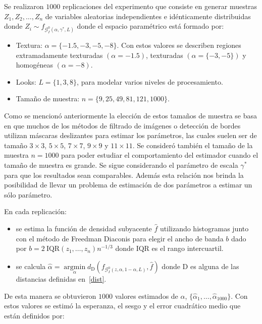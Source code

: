 Se realizaron $1000$ replicaciones del experimento que consiste en generar muestras $Z_1, Z_2,\ldots,Z_n$ de variables aleatorias independientes e idénticamente distribuidas donde $Z_i \sim f_{\mathcal{G}_I^0(\alpha,\gamma^*,L)}$ donde el espacio paramétrico está formado por:

\begin{itemize}
	\item Textura: $\alpha=\{-1.5, -3, -5, -8\}$. Con estos valores se describen regiones extramadamente texturadas $(\alpha=-1.5)$, texturadas $(\alpha=\{-3,-5\})$ y homogéneas $(\alpha=-8)$. 
	\item Looks: $L=\{1,3,8\}$, para modelar varios niveles de procesamiento.
	\item Tamaño de muestra: $n=\{9, 25,49, 81,121,1000\}$. 
\end{itemize}

Como se mencionó anteriormente la elección de estos tamaños de muestra se basa en que muchos de los métodos de filtrado de imágenes o detección de bordes utilizan máscaras deslizantes para estimar los parámetros, las cuales suelen ser de tamaño $3 \times 3$,  $5 \times 5$, $7 \times 7$, $9 \times 9$ y  $11 \times 11$. Se consideró también el tamaño de la muestra $n=1000$ para poder estudiar el comportamiento del estimador cuando el tamaño de muestra es grande. Se sigue considerando el parámetro de escala $\gamma^*$ para que los resultados sean comparables. Además esta relación nos brinda la posibilidad de llevar un problema de estimación de dos parámetros a estimar un sólo parámetro. 


En cada replicación:
\begin{itemize}
	\item se estima la función de densidad subyacente $\widehat{f}$ utilizando histogramas junto con el método de Freedman Diaconis para elegir el ancho de banda $b$ dado por $b=2 \ \text{IQR}(z_1,\ldots,z_n) n^{-1/3}$ donde $\text{IQR}$ es el rango intercuartil.
	\item se calcula $\widehat{\alpha}= \mathop{\text{argmin}}\limits_{\alpha}d_{\text{D}}(f_{\mathcal{G}_I^0(z,\alpha,1-\alpha,L)},\widehat{f})$ donde D es alguna de las distancias definidas en~\ref{dist}.
\end{itemize} 

De esta manera se obtuvieron $1000$ valores estimados de $\alpha$, $\{\widehat{\alpha}_1, \dots, \widehat{\alpha}_{1000}\}$. Con estos valores se estimó la esperanza, el sesgo y el error cuadrático medio que están definidos por:

